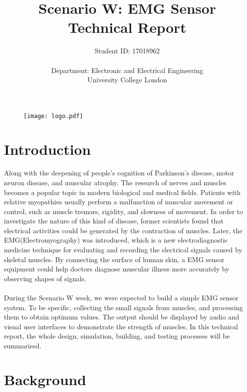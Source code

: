 \documentclass[12pt]{article}
\title{Scenario W: EMG Sensor \\ Technical Report}
\author{Student ID: 17018962 \\ \\ Department: Electronic and Electrical Engineering \\ University College London}
\begin{document}
    
    \begin{figure}[t]
    \centering
    \texttt{[image: logo.pdf]}
    \end{figure}
    \maketitle
    \thispagestyle{empty}

    \newpage
    \tableofcontents
    \thispagestyle{empty}
    \setcounter{page}{0}
    
    \newpage
    \pagestyle{plain}
    \section{Introduction}
    \paragraph{}
    Along with the deepening of people's cognition of Parkinson's disease, motor neuron disease, and muscular atrophy. The research of nerves and muscles becomes a popular topic in modern biological and medical fields. Patients with relative myopathies usually perform a malfunction of muscular movement or control, such as muscle tremors, rigidity, and slowness of movement. In order to investigate the nature of this kind of disease, former scientists found that electrical activities could be generated by the contraction of muscles. Later, the EMG(Electromyography) was introduced, which is a new electrodiagnostic medicine technique for evaluating and recording the electrical signals caused by skeletal muscles\cite{definition}. By connecting the surface of human skin, a EMG sensor equipment could help doctors diagnose muscular illness more accurately by observing shapes of signals.
    
    \paragraph{}
    During the Scenario W week, we were expected to build a simple EMG sensor system. To be specific, collecting the small signals from muscles, and processing them to obtain optimum values. The output should be displayed by audio and visual user interfaces to demonstrate the strength of muscles. In this technical report, the whole design, simulation, building, and testing processes will be summarised. 
    
    \section{Background}
\end{document}
